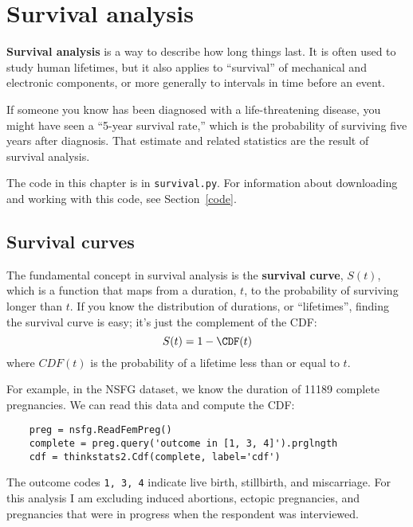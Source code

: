 \documentclass[12pt]{book}
\begin{document}
\chapter{Survival analysis}

{\bf Survival analysis} is a way to describe how long things last.
It is often used to study human lifetimes, but it
also applies to ``survival'' of mechanical and electronic components, or
more generally to intervals in time before an event.

If someone you know has been diagnosed with a life-threatening
disease, you might have seen a ``5-year survival rate,'' which
is the probability of surviving five years after diagnosis.  That
estimate and related statistics are the result of survival analysis.

The code in this chapter is in {\tt survival.py}.  For information
about downloading and working with this code, see Section~\ref{code}.


\section{Survival curves}
\label{survival}

The fundamental concept in survival analysis is the {\bf survival
  curve}, $S(t)$, which is a function that maps from a duration, $t$, to the
probability of surviving longer than $t$.  If you know the distribution
of durations, or ``lifetimes'', finding the survival curve is easy;
it's just the complement of the CDF: 
%
\[ S(t) = 1 - \CDF(t) \]
%
where $CDF(t)$ is the probability of a lifetime less than or equal
to $t$.
  

For example, in the NSFG dataset, we know the duration of 11189
complete pregnancies.  We can read this data and compute the CDF:

\begin{verbatim}
    preg = nsfg.ReadFemPreg()
    complete = preg.query('outcome in [1, 3, 4]').prglngth
    cdf = thinkstats2.Cdf(complete, label='cdf')
\end{verbatim}

The outcome codes {\tt 1, 3, 4} indicate live birth, stillbirth,
and miscarriage.  For this analysis I am excluding induced abortions,
ectopic pregnancies, and pregnancies that were in progress when
the respondent was interviewed.
\end{document}

